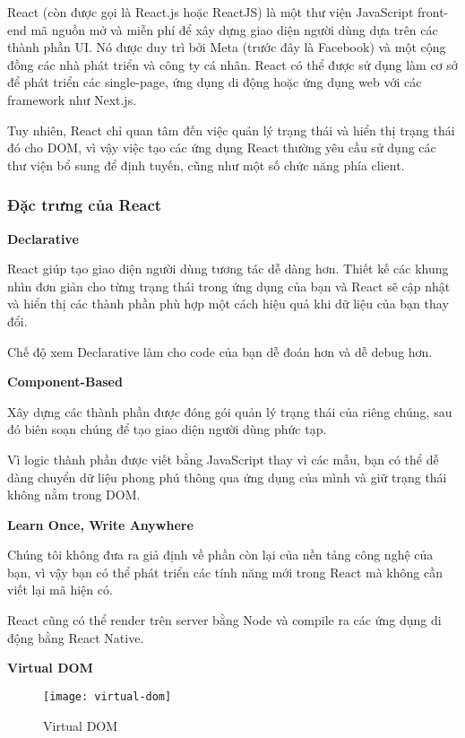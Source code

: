 React (còn được gọi là React.js hoặc ReactJS) là một thư viện JavaScript front-end mã nguồn mở và miễn phí để xây dựng giao diện người dùng dựa trên các thành phần UI. Nó được duy trì bởi Meta (trước đây là Facebook) và một cộng đồng các nhà phát triển và công ty cá nhân. React có thể được sử dụng làm cơ sở để phát triển các single-page, ứng dụng di động hoặc ứng dụng web với các framework như Next.js.

Tuy nhiên, React chỉ quan tâm đến việc quản lý trạng thái và hiển thị trạng thái đó cho DOM, vì vậy việc tạo các ứng dụng React thường yêu cầu sử dụng các thư viện bổ sung để định tuyến, cũng như một số chức năng phía client.

\subsubsection{Đặc trưng của React}

\textbf{Declarative}

React giúp tạo giao diện người dùng tương tác dễ dàng hơn. Thiết kế các khung nhìn đơn giản cho từng trạng thái trong ứng dụng của bạn và React sẽ cập nhật và hiển thị các thành phần phù hợp một cách hiệu quả khi dữ liệu của bạn thay đổi.

Chế độ xem Declarative làm cho code của bạn dễ đoán hơn và dễ debug hơn.

\textbf{Component-Based}

Xây dựng các thành phần được đóng gói quản lý trạng thái của riêng chúng, sau đó biên soạn chúng để tạo giao diện người dùng phức tạp.

Vì logic thành phần được viết bằng JavaScript thay vì các mẫu, bạn có thể dễ dàng chuyển dữ liệu phong phú thông qua ứng dụng của mình và giữ trạng thái không nằm trong DOM.

\textbf{Learn Once, Write Anywhere}

Chúng tôi không đưa ra giả định về phần còn lại của nền tảng công nghệ của bạn, vì vậy bạn có thể phát triển các tính năng mới trong React mà không cần viết lại mã hiện có.

React cũng có thể render trên server bằng Node và compile ra các ứng dụng di động bằng React Native.

\textbf{Virtual DOM}

\begin{figure}[ht]
	\centering
	\texttt{[image: virtual-dom]}
	\caption{Virtual DOM}
\end{figure}


